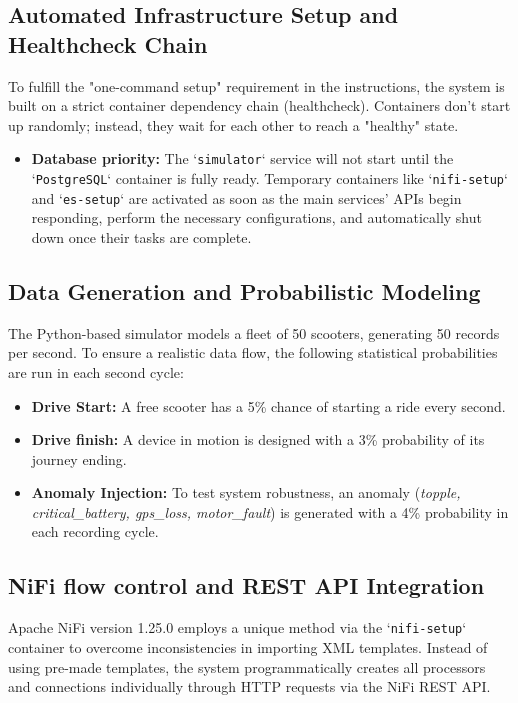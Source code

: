 \documentclass[conference]{IEEEtran}
\begin{document}
\subsection{Automated Infrastructure Setup and Healthcheck Chain}
To fulfill the "one-command setup" requirement in the instructions, the system is built on a strict container dependency chain (healthcheck). Containers don't start up randomly; instead, they wait for each other to reach a "healthy" state.
\begin{itemize}
    \item \textbf{Database priority:} The `\texttt{simulator}` service will not start until the `\texttt{PostgreSQL}` container is fully ready. Temporary containers like `\texttt{nifi-setup}` and `\texttt{es-setup}` are activated as soon as the main services' APIs begin responding, perform the necessary configurations, and automatically shut down once their tasks are complete.
\end{itemize}

\subsection{Data Generation and Probabilistic Modeling}
The Python-based simulator models a fleet of 50 scooters, generating 50 records per second. To ensure a realistic data flow, the following statistical probabilities are run in each second cycle:
\begin{itemize}
    \item \textbf{Drive Start:} A free scooter has a 5\% chance of starting a ride every second.
    \item \textbf{Drive finish:} A device in motion is designed with a 3\% probability of its journey ending.
    \item \textbf{Anomaly Injection:} To test system robustness, an anomaly (\textit{topple, critical\_battery, gps\_loss, motor\_fault}) is generated with a 4\% probability in each recording cycle.
\end{itemize}

\subsection{NiFi flow control and REST API Integration}
Apache NiFi version 1.25.0 employs a unique method via the `\texttt{nifi-setup}` container to overcome inconsistencies in importing XML templates. Instead of using pre-made templates, the system programmatically creates all processors and connections individually through HTTP requests via the NiFi REST API.
\end{document}
